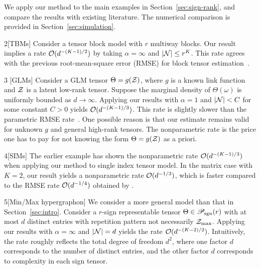 \documentclass[11pt]{article}
\theoremstyle{plain}
\theoremstyle{definition}
\def\caliP{\mathscr{P}_{\textup{sgn}}}
\begin{document}
We apply our method to the main examples in Section~\ref{sec:sign-rank}, and compare the results with existing literature. The numerical comparison is provided in Section~\ref{sec:simulation}. \\

\begin{customexample}{2}[TBMs]
Consider a tensor block model with $r$ multiway blocks. Our result implies a rate $\mathcal{O}(d^{-(K-1)/2})$ by taking $\alpha=\infty$ and $|\mathcal{N}| \leq r^K$. This rate agrees with the  previous root-mean-square error (RMSE) for block tensor estimation~\citep{wang2019multiway}.\\
\end{customexample}

\begin{customexample}{3} [GLMs] 
Consider a GLM tensor $\Theta=g(\mathcal{Z})$, where $g$ is a known link function and $\mathcal{Z}$ is a latent low-rank tensor. Suppose the marginal density of $\Theta(\omega)$ is uniformly bounded as $d\to\infty$. Applying our results with $\alpha=1$ and $|\mathcal{N}|<C$ for some constant $C>0$ yields $\mathcal{O}(d^{-(K-1)/3})$. This rate is slightly slower than the parametric RMSE rate~\citep{zhang2018tensor,wang2018learning}. One possible reason is that our estimate remains valid for unknown $g$ and general high-rank tensors. The nonparametric rate is the price one has to pay for not knowing the form $\Theta=g(\mathcal{Z})$ as a priori. \\
\end{customexample}

\begin{customexample}{4}[SIMs]
The earlier example has shown the nonparametric rate $\mathcal{O}(d^{-(K-1)/3})$ when applying our method to single index tensor model. In the matrix case with $K=2$, our result yields a nonparametric rate $\mathcal{O}(d^{-1/3})$, which is faster compared to the RMSE rate $\mathcal{O}(d^{-1/4})$ obtained by \cite{ganti2015matrix}. \\
\end{customexample}

\begin{customexample}{5}[Min/Max hypergraphon]
We consider a more general model than that in Section~\ref{sec:intro}. Consider a $r$-sign representable tensor $\Theta\in \caliP(r)$ with at most $d$ distinct entries with repetition pattern not necessarily $\mathcal{Z}_{\max}$. Applying our results with $\alpha=\infty$ and $|\mathcal{N}|=d$ yields the rate $\mathcal{O}(d^{-(K-2)/2})$. Intuitively, the rate roughly reflects the total degree of freedom $d^2$, where one factor $d$ corresponds to the number of distinct entries, and the other factor $d$ corresponds to complexity in each sign tensor. 
\end{customexample}
\end{document}
